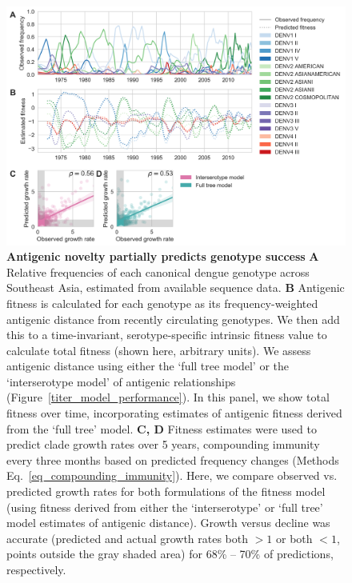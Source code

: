\documentclass[11pt,oneside,letterpaper]{article}
\begin{document}
\begin{figure}[h]
  \begin{centering}
\includegraphics[width=\linewidth]{../figures/png/genotype-fitness.png}
    \caption{\textbf{Antigenic novelty partially predicts genotype success }
    \textbf{A} Relative frequencies of each canonical dengue genotype across Southeast Asia, estimated from available sequence data.
    \textbf{B} Antigenic fitness is calculated for each genotype as its frequency-weighted antigenic distance from recently circulating genotypes.
    We then add this to a time-invariant, serotype-specific intrinsic fitness value to calculate total fitness (shown here, arbitrary units).
    We assess antigenic distance using either the `full tree model' or the `interserotype model' of antigenic relationships (Figure~\ref{titer_model_performance}).
    In this panel, we show total fitness over time, incorporating estimates of antigenic fitness derived from the `full tree' model.
    \textbf{C, D}  Fitness estimates were used to predict clade growth rates over 5 years, compounding immunity every three months based on predicted frequency changes (Methods Eq.~\ref{eq_compounding_immunity}).
    Here, we compare observed vs. predicted growth rates for both formulations of the fitness model (using fitness derived from either the `interserotype' or `full tree' model estimates of antigenic distance).
    Growth versus decline was accurate (predicted and actual growth rates both $> 1$ or both $< 1$, points outside the gray shaded area) for 68\% -- 70\% of predictions, respectively.
}
     \label{genotype_fitness}
   \end{centering}
\end{figure}
\end{document}
